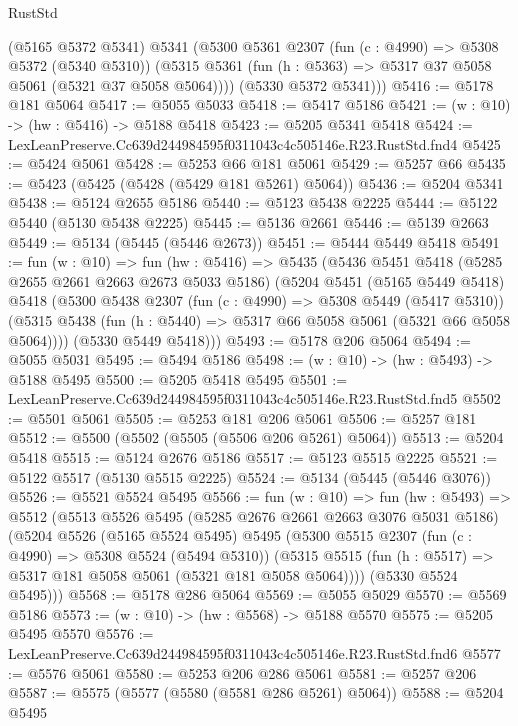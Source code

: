 \begin{lexlean}{RustStd}
\begin{coremodule}
        (@5165 @5372 @5341)
        @5341
        (@5300
          @5361
          @2307
          (fun (c : @4990) => @5308 @5372 (@5340 @5310))
          (@5315 @5361 (fun (h : @5363) => @5317 @37 @5058 @5061 (@5321 @37 @5058 @5064))))
        (@5330 @5372 @5341)))
@5416 := @5178 @181 @5064
@5417 := @5055 @5033
@5418 := @5417 @5186
@5421 := (w : @10) -> (hw : @5416) -> @5188 @5418
@5423 := @5205 @5341 @5418
@5424 := LexLeanPreserve.Cc639d244984595f0311043c4c505146e.R23.RustStd.fnd4
@5425 := @5424 @5061
@5428 := @5253 @66 @181 @5061
@5429 := @5257 @66
@5435 := @5423 (@5425 (@5428 (@5429 @181 @5261) @5064))
@5436 := @5204 @5341
@5438 := @5124 @2655 @5186
@5440 := @5123 @5438 @2225
@5444 := @5122 @5440 (@5130 @5438 @2225)
@5445 := @5136 @2661
@5446 := @5139 @2663
@5449 := @5134 (@5445 (@5446 @2673))
@5451 := @5444 @5449 @5418
@5491 := fun (w : @10) =>
  fun (hw : @5416) =>
  @5435
    (@5436
      @5451
      @5418
      (@5285 @2655 @2661 @2663 @2673 @5033 @5186)
      (@5204
        @5451
        (@5165 @5449 @5418)
        @5418
        (@5300
          @5438
          @2307
          (fun (c : @4990) => @5308 @5449 (@5417 @5310))
          (@5315 @5438 (fun (h : @5440) => @5317 @66 @5058 @5061 (@5321 @66 @5058 @5064))))
        (@5330 @5449 @5418)))
@5493 := @5178 @206 @5064
@5494 := @5055 @5031
@5495 := @5494 @5186
@5498 := (w : @10) -> (hw : @5493) -> @5188 @5495
@5500 := @5205 @5418 @5495
@5501 := LexLeanPreserve.Cc639d244984595f0311043c4c505146e.R23.RustStd.fnd5
@5502 := @5501 @5061
@5505 := @5253 @181 @206 @5061
@5506 := @5257 @181
@5512 := @5500 (@5502 (@5505 (@5506 @206 @5261) @5064))
@5513 := @5204 @5418
@5515 := @5124 @2676 @5186
@5517 := @5123 @5515 @2225
@5521 := @5122 @5517 (@5130 @5515 @2225)
@5524 := @5134 (@5445 (@5446 @3076))
@5526 := @5521 @5524 @5495
@5566 := fun (w : @10) =>
  fun (hw : @5493) =>
  @5512
    (@5513
      @5526
      @5495
      (@5285 @2676 @2661 @2663 @3076 @5031 @5186)
      (@5204
        @5526
        (@5165 @5524 @5495)
        @5495
        (@5300
          @5515
          @2307
          (fun (c : @4990) => @5308 @5524 (@5494 @5310))
          (@5315 @5515 (fun (h : @5517) => @5317 @181 @5058 @5061 (@5321 @181 @5058 @5064))))
        (@5330 @5524 @5495)))
@5568 := @5178 @286 @5064
@5569 := @5055 @5029
@5570 := @5569 @5186
@5573 := (w : @10) -> (hw : @5568) -> @5188 @5570
@5575 := @5205 @5495 @5570
@5576 := LexLeanPreserve.Cc639d244984595f0311043c4c505146e.R23.RustStd.fnd6
@5577 := @5576 @5061
@5580 := @5253 @206 @286 @5061
@5581 := @5257 @206
@5587 := @5575 (@5577 (@5580 (@5581 @286 @5261) @5064))
@5588 := @5204 @5495

\end{coremodule}
\end{lexlean}
